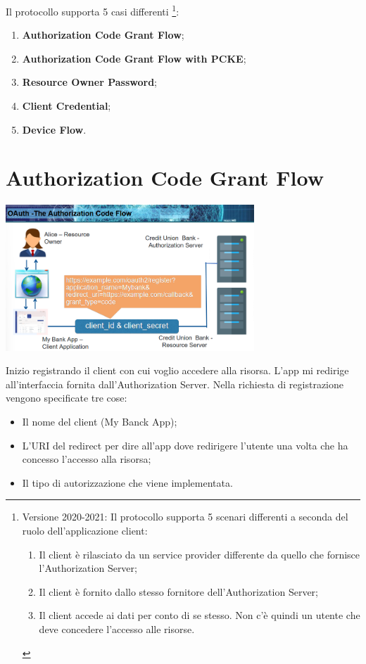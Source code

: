 \noindent Il protocollo supporta 5 casi differenti \footnote{Versione 2020-2021: \noindent Il protocollo supporta 5 scenari differenti a seconda del ruolo dell'applicazione client:
\begin{enumerate}
    \item Il client è rilasciato da un service provider differente da quello che fornisce l'Authorization Server;
    \item Il client è fornito dallo stesso fornitore dell'Authorization Server;
    \item Il client accede ai dati per conto di se stesso. Non c'è quindi un utente che deve concedere l'accesso alle risorse.
\end{enumerate}}:
\begin{enumerate}
    \item \textbf{Authorization Code Grant Flow};
    \item \textbf{Authorization Code Grant Flow with PCKE};
    \item \textbf{Resource Owner Password};
    \item \textbf{Client Credential};
    \item \textbf{Device Flow}.
\end{enumerate}

\section{Authorization Code Grant Flow}

\begin{center}
    \includegraphics[width=0.7\textwidth]{images/8.png}
\end{center}
    
\noindent Inizio registrando il client con cui voglio accedere alla risorsa. L'app mi redirige all'interfaccia fornita dall'Authorization Server. Nella richiesta di registrazione vengono specificate tre cose: 
\begin{itemize}
    \item Il nome del client (My Banck App); 
    \item L'URI del redirect per dire all'app dove redirigere l'utente una volta che ha concesso l'accesso alla risorsa;
    \item  Il tipo di autorizzazione che viene implementata.
\end{itemize}


